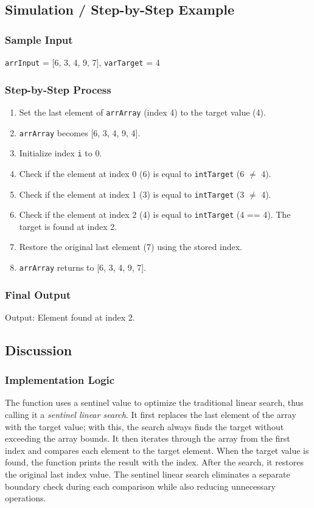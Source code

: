 \documentclass{article}
\begin{document}
\subsection*{Simulation / Step-by-Step Example}
\subsubsection*{Sample Input}
\texttt{arrInput} = [6, 3, 4, 9, 7], \texttt{varTarget} = 4
\subsubsection*{Step-by-Step Process}
\begin{enumerate}
    \item Set the last element of \texttt{arrArray} (index 4) to the target value (4).
    \item \texttt{arrArray} becomes [6, 3, 4, 9, 4].
    \item Initialize index \texttt{i} to 0.
    \item Check if the element at index 0 (6) is equal to \texttt{intTarget} (6 $\neq$ 4).
    \item Check if the element at index 1 (3) is equal to \texttt{intTarget} (3 $\neq$ 4).
    \item Check if the element at index 2 (4) is equal to \texttt{intTarget} (4 == 4). The target is found at index 2.
    \item Restore the original last element (7) using the stored index.
    \item \texttt{arrArray} returns to [6, 3, 4, 9, 7].
\end{enumerate}

\subsubsection*{Final Output}
Output: Element found at index 2.
\subsection*{Discussion}
\subsubsection*{Implementation Logic}
The function uses a sentinel value to optimize the traditional linear search, thus calling it a \textit{sentinel linear search}. It first replaces the last element of the array with the target value; with this, the search always finds the target without exceeding the array bounds. It then iterates through the array from the first index and compares each element to the target element. When the target value is found, the function prints the result with the index. After the search, it restores the original last index value. The sentinel linear search eliminates a separate boundary check during each comparison while also reducing unnecessary operations.
\end{document}
